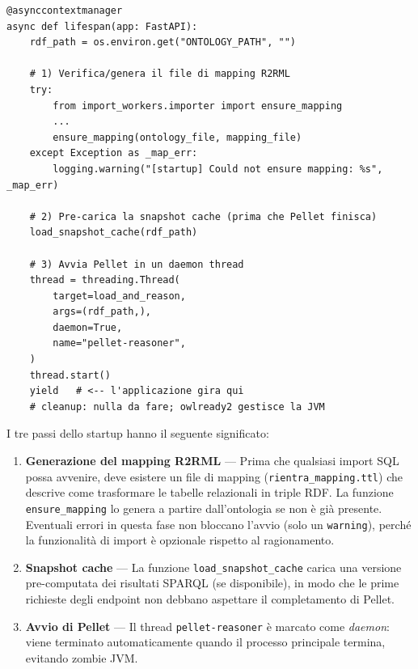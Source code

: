 \documentclass[a4paper,12pt]{article}
\begin{document}
\begin{lstlisting}[caption={Lifespan handler --- startup sequence (\texttt{main.py}, righe 76--104).}]
@asynccontextmanager
async def lifespan(app: FastAPI):
    rdf_path = os.environ.get("ONTOLOGY_PATH", "")

    # 1) Verifica/genera il file di mapping R2RML
    try:
        from import_workers.importer import ensure_mapping
        ...
        ensure_mapping(ontology_file, mapping_file)
    except Exception as _map_err:
        logging.warning("[startup] Could not ensure mapping: %s", _map_err)

    # 2) Pre-carica la snapshot cache (prima che Pellet finisca)
    load_snapshot_cache(rdf_path)

    # 3) Avvia Pellet in un daemon thread
    thread = threading.Thread(
        target=load_and_reason,
        args=(rdf_path,),
        daemon=True,
        name="pellet-reasoner",
    )
    thread.start()
    yield   # <-- l'applicazione gira qui
    # cleanup: nulla da fare; owlready2 gestisce la JVM
\end{lstlisting}

\noindent I tre passi dello startup hanno il seguente significato:

\begin{enumerate}
  \item \textbf{Generazione del mapping R2RML} --- Prima che qualsiasi import
        SQL possa avvenire, deve esistere un file di mapping
        (\texttt{rientra\_mapping.ttl}) che descrive come trasformare le
        tabelle relazionali in triple RDF. La funzione \texttt{ensure\_mapping}
        lo genera a partire dall'ontologia se non \`{e} gi\`{a} presente. Eventuali
        errori in questa fase non bloccano l'avvio (solo un \texttt{warning}),
        perch\'{e} la funzionalit\`{a} di import \`{e} opzionale rispetto al ragionamento.

  \item \textbf{Snapshot cache} --- La funzione \texttt{load\_snapshot\_cache}
        carica una versione pre-computata dei risultati SPARQL
        (se disponibile), in modo che le prime richieste degli endpoint
        non debbano aspettare il completamento di Pellet.

  \item \textbf{Avvio di Pellet} --- Il thread \texttt{pellet-reasoner} \`{e}
        marcato come \textit{daemon}: viene terminato automaticamente quando
        il processo principale termina, evitando zombie JVM.
\end{enumerate}
\end{document}
